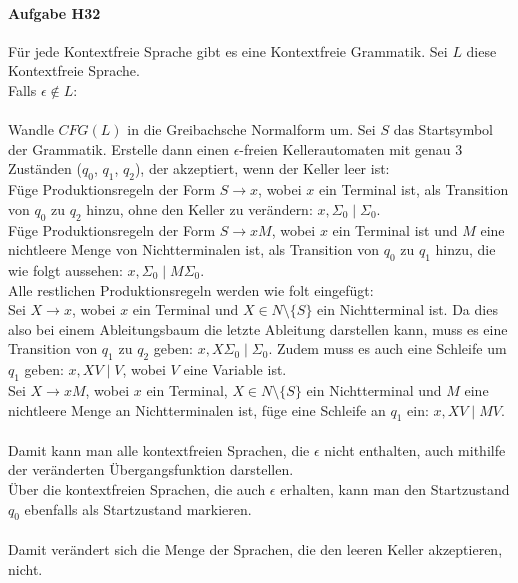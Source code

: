 \documentclass[11pt]{article}
\begin{document}
\paragraph{Aufgabe H32}
Für jede Kontextfreie Sprache gibt es eine Kontextfreie Grammatik. Sei $L$ diese Kontextfreie Sprache.
\\Falls $\epsilon\not\in L$:
\\\\Wandle $CFG(L)$ in die Greibachsche Normalform um. Sei $S$ das Startsymbol der Grammatik. Erstelle dann einen $\epsilon$-freien Kellerautomaten mit genau 3 Zuständen ($q_0$, $q_1$, $q_2$), der akzeptiert, wenn der Keller leer ist:
\\Füge Produktionsregeln der Form $S\rightarrow x$, wobei $x$ ein Terminal ist, als Transition von $q_0$ zu $q_2$ hinzu, ohne den Keller zu verändern: $x, \Sigma_0 \mid \Sigma_0$.
\\Füge Produktionsregeln der Form $S\rightarrow xM$, wobei $x$ ein Terminal ist und $M$ eine nichtleere Menge von Nichtterminalen ist, als Transition von $q_0$ zu $q_1$ hinzu, die wie folgt aussehen: $x, \Sigma_0 \mid M\Sigma_0$.
\\Alle restlichen Produktionsregeln werden wie folt eingefügt:
\\Sei $X\rightarrow x$, wobei $x$ ein Terminal und $X\in N \setminus\{S\}$ ein Nichtterminal ist. Da dies also bei einem Ableitungsbaum die letzte Ableitung darstellen kann, muss es eine Transition von $q_1$ zu $q_2$ geben: $x, X\Sigma_0 \mid \Sigma_0$. Zudem muss es auch eine Schleife um $q_1$ geben: $x, XV \mid V$, wobei $V$ eine Variable ist.
\\Sei $X\rightarrow xM$, wobei $x$ ein Terminal, $X\in N \setminus\{S\}$ ein Nichtterminal und $M$ eine nichtleere Menge an Nichtterminalen ist, füge eine Schleife an $q_1$ ein: $x, XV \mid MV$.
\\\\Damit kann man alle kontextfreien Sprachen, die $\epsilon$ nicht enthalten, auch mithilfe der veränderten Übergangsfunktion darstellen.
\\Über die kontextfreien Sprachen, die auch $\epsilon$ erhalten, kann man den Startzustand $q_0$ ebenfalls als Startzustand markieren.
\\\\Damit verändert sich die Menge der Sprachen, die den leeren Keller akzeptieren, nicht.
\end{document}

